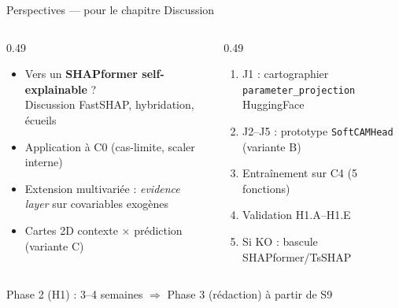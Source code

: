 \documentclass[10pt]{beamer}
\begin{document}
\begin{frame}{Perspectives — pour le chapitre Discussion}
  \begin{columns}
    \begin{column}{0.49\textwidth}
      \begin{tcolorbox}[colback=orange!3, colframe=orange!60!black, arc=2mm,
                        fonttitle=\bfseries, title=Pistes non explorées]
        \begin{itemize}
          \item Vers un \textbf{SHAPformer self-explainable} ?\\
                {\small Discussion FastSHAP, hybridation, écueils}
          \item Application à C0 (cas-limite, scaler interne)
          \item Extension multivariée : \emph{evidence layer} sur covariables exogènes
          \item Cartes 2D contexte $\times$ prédiction (variante C)
        \end{itemize}
      \end{tcolorbox}
    \end{column}
    \begin{column}{0.49\textwidth}
      \begin{tcolorbox}[colback=green!3, colframe=green!50!black, arc=2mm,
                        fonttitle=\bfseries, title=Prochaines étapes Phase 2]
        \begin{enumerate}
          \item J1 : cartographier \texttt{parameter\_projection} HuggingFace
          \item J2--J5 : prototype \texttt{SoftCAMHead} (variante B)
          \item Entraînement sur C4 (5 fonctions)
          \item Validation H1.A--H1.E
          \item Si KO : bascule SHAPformer/TsSHAP
        \end{enumerate}
      \end{tcolorbox}
    \end{column}
  \end{columns}

  \vspace{4pt}
  \begin{tcolorbox}[colback=newcontrib!5, colframe=newcontrib!70!black, arc=2mm, fonttitle=\bfseries,
                    title=Calendrier]
    \centering
    Phase 2 (H1) : 3--4 semaines $\Rightarrow$ Phase 3 (rédaction) à partir de S9
  \end{tcolorbox}
\end{frame}
\end{document}
